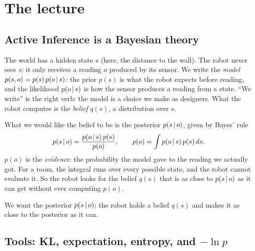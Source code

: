 \documentclass[11pt]{article}
\begin{document}
\section{The lecture}

\subsection{Active Inference is a Bayesian theory}

The world has a hidden state $s$ (here, the distance to the wall). The robot never sees $s$; it only receives a reading $o$ produced by its sensor. We write the \emph{model} $p(s,o) = p(s)\,p(o\,|\, s)$: the prior $p(s)$ is what the robot expects before reading, and the likelihood $p(o\,|\, s)$ is how the sensor produces a reading from a state. ``We write'' is the right verb: the model is a choice we make as designers. What the robot computes is the \emph{belief} $q(s)$, a distribution over $s$.

What we would like the belief to be is the posterior $p(s\,|\, o)$, given by Bayes' rule
\[
p(s\,|\, o) = \frac{p(o\,|\, s)\,p(s)}{p(o)},\qquad p(o) = \int p(o\,|\, s)\,p(s)\,ds .
\]
$p(o)$ is the \emph{evidence}: the probability the model gave to the reading we actually got. For a room, the integral runs over every possible state, and the robot cannot evaluate it. So the robot looks for the belief $q(s)$ that is as close to $p(s\,|\, o)$ as it can get without ever computing $p(o)$.

\begin{keyidea}
We want the posterior $p(s\,|\, o)$; the robot holds a belief $q(s)$ and makes it as close to the posterior as it can.
\end{keyidea}

\subsection{Tools: KL, expectation, entropy, and $-\ln p$}
\end{document}
